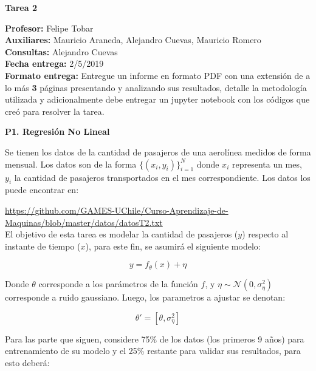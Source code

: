 \documentclass[11pt,letterpaper]{article}
\begin{document}
\pagestyle{fancy}
\fancyhf{}

\begin{center}
\large {\textbf{Tarea 2}}\\
\end{center}
\textbf{Profesor:} Felipe Tobar\\ 
\textbf{Auxiliares:} Mauricio Araneda, Alejandro Cuevas, Mauricio Romero \\
\textbf{Consultas:} Alejandro Cuevas \\
\textbf{Fecha entrega:} 2/5/2019 \\

\textbf{Formato entrega:} Entregue un informe en formato PDF con una extensión de a lo más \textbf{3} páginas presentando y analizando sus resultados, detalle la metodología utilizada y adicionalmente debe entregar un jupyter notebook con los códigos que creó para resolver la tarea.
\vspace{5mm}


\vspace{5 mm}
\noindent\textbf{P1. Regresión No Lineal}
\vspace{5 mm}

Se tienen los datos de la cantidad de pasajeros de una aerolínea medidos de forma mensual. Los datos son de la forma $\{(x_i,y_i)\}_{i=1}^N$ donde $x_i$ representa un mes, $y_i$ la cantidad de pasajeros transportados en el mes correspondiente. Los datos los puede encontrar en:

\url{https://github.com/GAMES-UChile/Curso-Aprendizaje-de-Maquinas/blob/master/datos/datosT2.txt}\\

El objetivo de esta tarea es modelar la cantidad de pasajeros ($y$) respecto al instante de tiempo ($x$), para este fin, se asumirá el siguiente modelo:

$$y = f_\theta(x)+\eta $$

Donde $\theta$ corresponde a los parámetros de la función $f$, y $\eta \sim \mathcal{N}(0,\sigma_{\eta}^2)$ corresponde a ruido gaussiano.
Luego, los parametros a ajustar se denotan:

$$ \theta' = [\theta, \sigma_{\eta}^2]$$

Para las parte que siguen, considere 75\% de los datos (los primeros 9 años) para entrenamiento de su modelo y el 25\% restante para validar sus resultados, para esto deberá:
\end{document}
